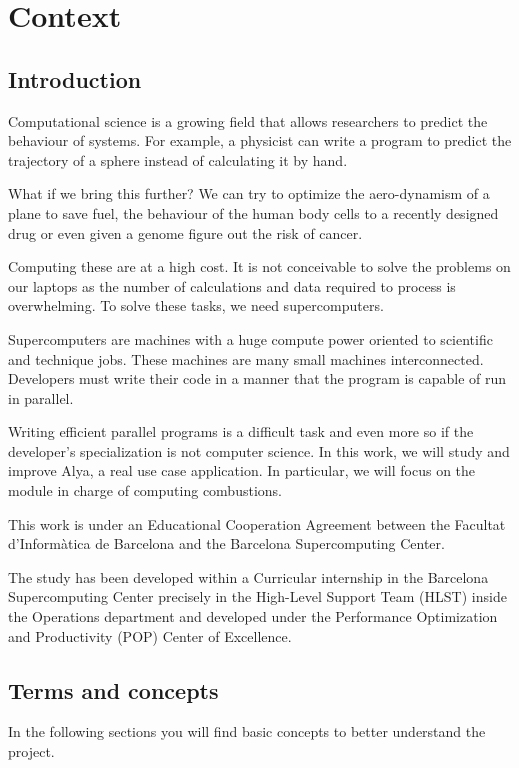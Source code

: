 \section{Context}

\subsection{Introduction}

\justify
Computational science is a growing field that allows researchers to predict the behaviour of systems. For example, a physicist can write a program to predict the trajectory of a sphere instead of calculating it by hand.

\justify
 What if we bring this further?  We can try to optimize the aero-dynamism of a plane to save fuel, the behaviour of the human body cells to a recently designed drug or even given a genome figure out the risk of cancer.

\justify
Computing these are at a high cost. It is not conceivable to solve the problems on our laptops as the number of calculations and data required to process is overwhelming. To solve these tasks, we need supercomputers.

\justify
Supercomputers are machines with a huge compute power oriented to scientific and technique jobs. These machines are many small machines interconnected. Developers must write their code in a manner that the program is capable of run in parallel. 

\justify
Writing efficient parallel programs is a difficult task and even more so if the developer's specialization is not computer science. In this work, we will study and improve Alya\cite{alya}, a real use case application. In particular, we will focus on the module in charge of computing combustions.


\justify
This work is under an Educational Cooperation Agreement between the Facultat d'Informàtica de Barcelona and the Barcelona Supercomputing Center.

\justify
The study has been developed within a Curricular internship in the Barcelona Supercomputing Center precisely in the High-Level Support Team (HLST) inside the Operations department and developed under the Performance Optimization and Productivity\cite{popWeb} (POP) Center of Excellence.

\subsection{Terms and concepts}
\justify
In the following sections you will find basic concepts to better understand the project.

